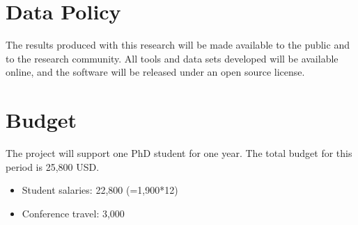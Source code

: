 \documentclass[11pt]{article}
\begin{document}
\section{Data Policy}

The results produced with this research will be made available to the
public and to the research community.  All tools and data sets
developed will be available online, and the software will be released
under an open source license.

\section{Budget}

The project will support one PhD student for one year.  The total
budget for this period is 25,800 USD.

\begin{itemize}
  \setlength\itemsep{0.05em}  
\item Student salaries: 22,800 (=1,900*12)
\item Conference travel: 3,000
\end{itemize}


\footnotesize


\end{document}
